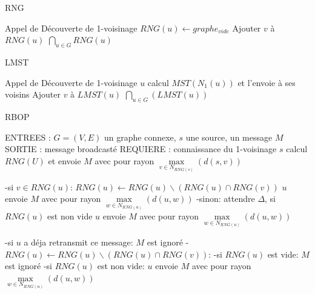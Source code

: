 \begin{algorithm}[h]
\caption{RNG}
\label{RNG}
\begin{algorithmic}
	\STATE Appel de Découverte de 1-voisinage
\ENDFOR
{}
	\STATE  $RNG(u) \leftarrow graphe_{vide}$
	    \STATE Ajouter $v$ à $RNG(u)$
	  \ENDIF
        \ENDFOR
\ENDFOR
\RETURN $\bigcap_{u \in G} RNG(u)$
\end{algorithmic}
\end{algorithm}

\begin{algorithm}[h]
\caption{LMST}
\label{LMST}
\begin{algorithmic}
	\STATE Appel de Découverte de 1-voisinage
	\STATE $u$ calcul $MST(N_1(u))$ et l'envoie à ses voisins
\ENDFOR
{}
	    \STATE Ajouter $v$ à $LMST(u)$
	  \ENDIF
        \ENDFOR
\ENDFOR
\RETURN $\bigcap_{u \in G}( LMST(u))$
\end{algorithmic}
\end{algorithm}


\begin{algorithm}[H]
\caption{RBOP}
\label{algo_RBOP}
\begin{algorithmic}
\STATE ENTREES : $G=(V,E)$ un graphe connexe, $s$ une source, un message $M$
\STATE SORTIE : message broadcasté
\STATE REQUIERE : connaissance du 1-voisinage
\STATE $s$ calcul $RNG(U)$ et envoie $M$ avec pour rayon $\max\limits_{v\in N_{RNG(s)}}(d(s,v))$

		\STATE -si $v\in RNG(u)$: $RNG(u)\leftarrow RNG(u)\backslash(RNG(u)\cap RNG(v))$ $u$ envoie $M$ avec pour rayon $\max\limits_{w\in N_{RNG(u)}}(d(u,w))$
		\STATE -sinon: attendre $\Delta$, si $RNG(u)$ est non vide  $u$ envoie $M$ avec pour rayon $\max\limits_{w\in N_{RNG(u)}}(d(u,w))$
			 	
	\ENDIF
		\STATE -si $u$ a déja retransmit ce message: $M$ est ignoré
		\STATE -$RNG(u)\leftarrow RNG(u)\backslash(RNG(u)\cap RNG(v))$:
		\INDSTATE   -si $RNG(u)$ est vide: $M$ est ignoré
		\INDSTATE   -si $RNG(u)$ est non vide: $u$ envoie $M$ avec pour rayon $\max\limits_{w\in N_{RNG(u)}}(d(u,w))$
			 	
	\ENDIF

\ENDIF
\end{algorithmic}
\end{algorithm}

